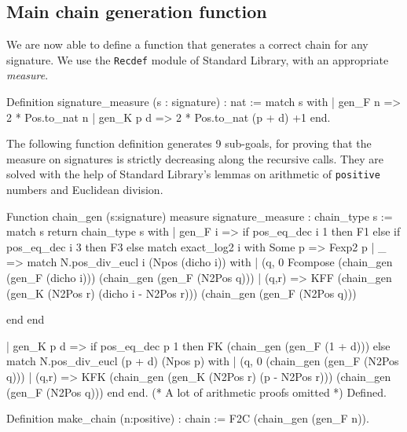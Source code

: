 \subsection{Main chain generation function}
We are now able to define a function that generates a correct chain 
for any signature. We use the \texttt{Recdef} module of Standard Library,
with an appropriate \emph{measure}.

\begin{Coqsrc}
Definition signature_measure (s : signature) : nat :=
match s with
  | gen_F n => 2 * Pos.to_nat n 
  | gen_K p d => 2 * Pos.to_nat (p + d) +1
end.
\end{Coqsrc}


The following function definition generates 9 sub-goals,
for proving that the measure on signatures is strictly decreasing along
the recursive calls. They are solved with the help of Standard Library's lemmas 
on arithmetic of \texttt{positive} numbers and Euclidean division.




\begin{Coqsrc}
Function chain_gen  (s:signature) {measure signature_measure}
:  chain_type s :=
  match s  return chain_type s with
    | gen_F i =>
      if pos_eq_dec i 1 then F1 else
        if pos_eq_dec i 3
        then F3
        else 
          match exact_log2 i with
              Some p => Fexp2 p
            | _ =>
              match N.pos_div_eucl i (Npos (dicho i))
              with
                | (q, 0%
                  Fcompose  (chain_gen (gen_F (dicho i)))
                            (chain_gen (gen_F (N2Pos q)))
                | (q,r)  => KFF (chain_gen
                                   (gen_K (N2Pos r)
                                          (dicho i - N2Pos r)))
                                (chain_gen (gen_F (N2Pos q)))
                                
              end end
\end{Coqsrc}

\begin{Coqsrc}
    | gen_K p d =>
      if pos_eq_dec p 1 then FK (chain_gen (gen_F (1 + d)))
      else
        match N.pos_div_eucl (p + d)  (Npos p) with
          | (q, 0%
                              (chain_gen (gen_F (N2Pos q)))
          | (q,r)  => KFK (chain_gen (gen_K (N2Pos r)
                                            (p - N2Pos r)))
                          (chain_gen (gen_F (N2Pos q)))
        end
  end.
(* A lot of arithmetic proofs omitted *)
Defined.

Definition make_chain (n:positive) : chain :=
 F2C (chain_gen (gen_F n)).

\end{Coqsrc}

